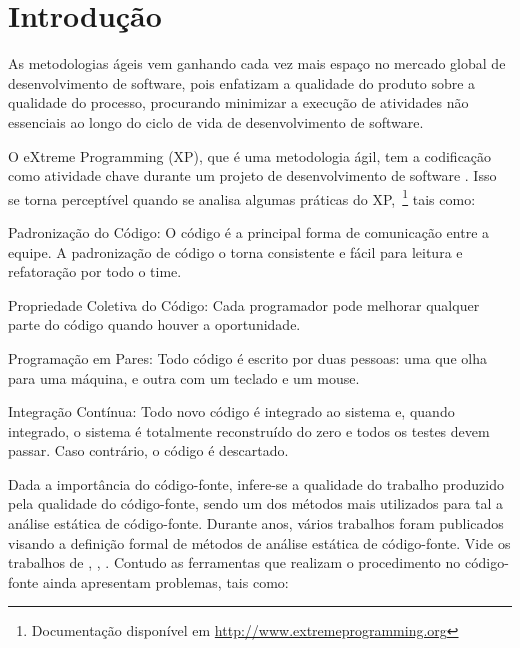 \chapter{Introdução}

As metodologias ágeis vem ganhando cada vez mais espaço no mercado global de desenvolvimento de software, pois enfatizam a qualidade do produto sobre a qualidade do processo, procurando minimizar a execução de atividades não essenciais ao longo do ciclo de vida de desenvolvimento de software.

O eXtreme Programming (XP), que é uma metodologia ágil, tem a codificação como atividade chave durante um projeto de desenvolvimento de software \cite{beck1999}. Isso se torna perceptível quando se analisa algumas práticas do XP,~\footnote{Documentação disponível em \url{http://www.extremeprogramming.org}} tais como:



\begin{pratices}

\item Padronização do Código: O código é a principal forma de comunicação entre 
a equipe. A padronização de código o torna consistente e fácil para leitura e 
refatoração por todo o time.

\item Propriedade Coletiva do Código: Cada programador pode melhorar qualquer 
parte do código quando houver a oportunidade.

\item Programação em Pares: Todo código é escrito por duas pessoas: uma que 
olha para uma máquina, e outra com um teclado e um mouse.

\item Integração Contínua: Todo novo código é integrado ao sistema e, quando 
integrado, o sistema é totalmente reconstruído do zero e todos os testes devem 
passar. Caso contrário, o código é descartado.

\end{pratices} 

Dada a importância do código-fonte, infere-se a qualidade do trabalho produzido
 pela qualidade do código-fonte, sendo um dos métodos mais utilizados
para tal a análise estática de código-fonte. Durante anos, vários trabalhos 
foram publicados visando a definição formal de métodos de análise estática 
de código-fonte. Vide os trabalhos de , 
, .
Contudo as ferramentas que realizam o procedimento no código-fonte ainda 
apresentam problemas, tais como:

